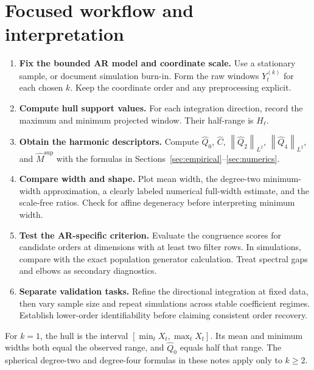 \documentclass[11pt,a4paper]{article}
\newcommand{\norm}[1]{\left\lVert #1\right\rVert}
\newcommand{\hQ}{\widehat Q}
\newcommand{\hC}{\widehat C}
\newcommand{\hM}{\widehat M}
\begin{document}
\section{Focused workflow and interpretation}\label{sec:workflow}
\begin{enumerate}
\item \textbf{Fix the bounded AR model and coordinate scale.} Use a stationary
sample, or document simulation burn-in. Form the raw windows $Y_t^{(k)}$ for each
chosen $k$. Keep the coordinate order and any preprocessing explicit.
\item \textbf{Compute hull support values.} For each integration direction, record
the maximum and minimum projected window. Their half-range is $H_\ell$.
\item \textbf{Obtain the harmonic descriptors.} Compute $\hQ_0$, $\hC$,
$\norm{\hQ_2}_{L^2}$, $\norm{\hQ_4}_{L^2}$, and
$\hM^{\mathrm{sup}}$ with the formulas in Sections~\ref{sec:empirical}--\ref{sec:numerics}.
\item \textbf{Compare width and shape.} Plot mean width, the degree-two
minimum-width approximation, a clearly labeled numerical full-width estimate,
and the scale-free ratios. Check for affine degeneracy before interpreting
minimum width.
\item \textbf{Test the AR-specific criterion.} Evaluate the congruence scores for
candidate orders at dimensions with at least two filter rows. In simulations,
compare with the exact population generator calculation. Treat spectral gaps and
elbows as secondary diagnostics.
\item \textbf{Separate validation tasks.} Refine the directional integration at
fixed data, then vary sample size and repeat simulations across stable coefficient
regimes. Establish lower-order identifiability before claiming consistent order
recovery.
\end{enumerate}

For $k=1$, the hull is the interval $[\min_tX_t,\max_tX_t]$. Its mean and minimum
widths both equal the observed range, and $\hQ_0$ equals half that range. The
spherical degree-two and degree-four formulas in these notes apply only to $k\ge2$.
\end{document}
